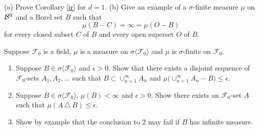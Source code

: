 \begin{exercise}
(a) Prove Corollary \ref{ir} for $d=1$.
(b)
Give an example of a $\sigma$-finite measure $\mu$ on $\mathcal B^{\Bbb R}$ and a Borel set $B$ such that
\[ \mu(B-C)= \infty = \mu(O-B) \]
for every closed subset $C$ of $B$ and every open superset $O$ of $B$.
\end{exercise}







\begin{exercise}
\label{l1}
Suppose  $\mathcal F_0$ is a field, $\mu$ is a measure on $\sigma\langle \mathcal F_0\rangle$ and $\mu$ is $\sigma$-finite on $\mathcal F_0$.
\begin{enumerate}
\item
Suppose $B\in \sigma\langle\mathcal F_0\rangle$ and $\epsilon>0$. Show that there exists a disjoint sequence of $\mathcal F_0$-sets $A_1, A_2,\ldots$ such that $B\subset \cup_{n=1}^\infty A_n$ and $ \mu\bigl( \cup_{n=1}^\infty A_n -
 B\bigr)\leq \epsilon$.
 \item Suppose $B\in \sigma\langle\mathcal F_0\rangle$, $\mu(B)<\infty$ and $\epsilon>0$. Show there exists an $\mathcal F_0$-set $A$ such that $\mu(A \,\triangle\, B)\leq \epsilon$.
\item Show by example that the conclusion to 2 may fail if $B$ has infinite measure.
 \end{enumerate}
\end{exercise}


